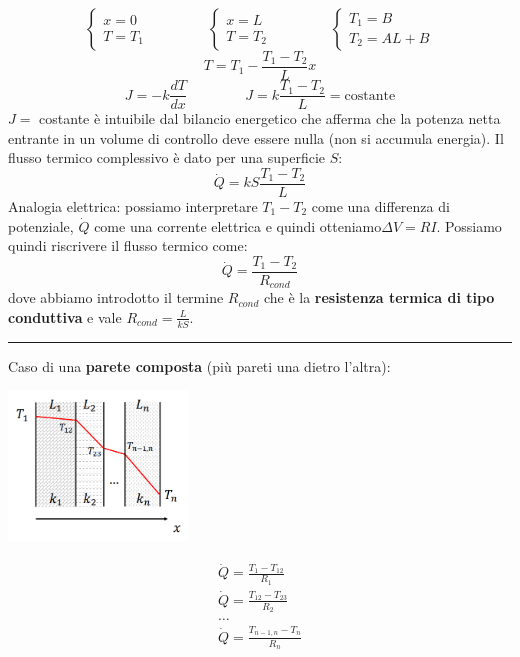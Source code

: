 \[
    \begin{cases}
        x = 0\\ T = T_1
    \end{cases} \;\;\;\;\;\;\;\;\;\;\;\;\;\;\; \begin{cases}
        x = L\\ T = T_2
    \end{cases} \;\;\;\;\;\;\;\;\;\;\;\;\;\;\; \begin{cases}
        T_1 = B \\ T_2 = AL+B
    \end{cases}
\]
\[
    T = T_1 - \frac{T_1-T_2}{L}x
\]
\[
    J = - k \frac{dT}{dx} \;\;\;\;\;\;\;\;\;\;\;\;\;\;\; J = k \frac{T_1-T_2}{L} = \text{costante}
\]
$J =$ costante è intuibile dal bilancio energetico che afferma che la potenza netta entrante in un volume di controllo deve essere nulla (non si accumula energia).\newline
\newline
Il flusso termico complessivo è dato per una superficie $S$:
\[
    \dot{Q} = k S \frac{T_1-T_2}{L}
\]
Analogia elettrica: possiamo interpretare $T_1-T_2$ come una differenza di potenziale, $\dot{Q}$ come una corrente elettrica e quindi otteniamo$\Delta V = RI$. Possiamo quindi riscrivere il flusso termico come:
\[
    \dot{Q} = \frac{T_1-T_2}{R_{cond}}
\]
dove abbiamo introdotto il termine $R_{cond}$ che è la \textbf{resistenza termica di tipo conduttiva} e vale $R_{cond} = \frac{L}{kS}$.\newline
\newline
\rule{\textwidth}{0,4pt}
Caso di una \textbf{parete composta} (più pareti una dietro l'altra):
\begin{center}
    \includegraphics[height=4cm]{../L10/img3.PNG}
\end{center}
\[
    \begin{matrix}
        \dot{Q} = \frac{T_1-T_{12}}{R_1}\\
        \dot{Q} = \frac{T_{12} - T_{23}}{R_2}\\
        \dots\\
        \dot{Q} = \frac{T_{n-1,n} - T_{n}}{R_n}
    \end{matrix}  
\]
